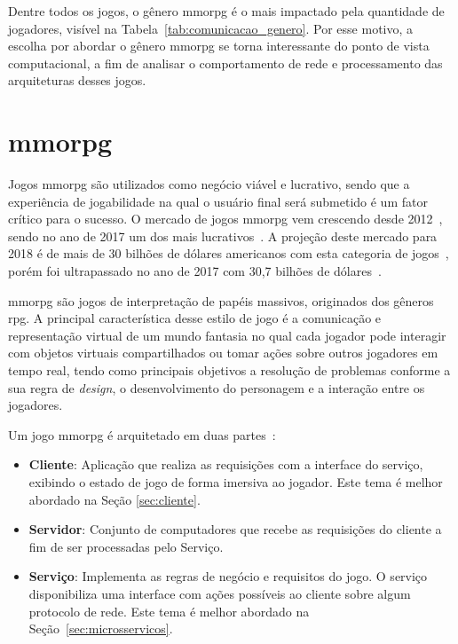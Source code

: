 Dentre todos os jogos, o gênero \ac{mmorpg} é o mais impactado pela quantidade de jogadores\cite{mmo_analytic}, visível na Tabela~\ref{tab:comunicacao_genero}.
%
Por esse motivo, a escolha por abordar o gênero \ac{mmorpg} se torna interessante do ponto de vista computacional, a fim de analisar o comportamento de rede e processamento das arquiteturas desses jogos.


\section{\ac{mmorpg}}
\label{sec:mmorpg}



Jogos \ac{mmorpg} são utilizados como negócio viável e lucrativo, sendo que a experiência de jogabilidade na qual o usuário final será submetido é um fator crítico para o sucesso.
%
O mercado de jogos \ac{mmorpg} vem crescendo desde 2012~\cite{new_york_times}, sendo no ano de 2017 um dos mais lucrativos~\cite{statista_2018_mmo}.
%
A projeção deste mercado para 2018 é de mais de 30 bilhões de dólares americanos com esta categoria de jogos~\cite{statista_2018}, porém foi ultrapassado no ano de 2017 com 30,7 bilhões de dólares~\cite{statista_2018_mmo}.



\ac{mmorpg} são jogos de interpretação de papéis massivos, originados dos gêneros \ac{rpg}.
%
A principal característica desse estilo de jogo é a comunicação e representação virtual de um mundo fantasia no qual cada jogador pode interagir com objetos virtuais compartilhados ou tomar ações sobre outros jogadores em tempo real, tendo como principais objetivos a resolução de problemas conforme a sua regra de \textit{design}, o desenvolvimento do personagem e a interação entre os jogadores\cite{video_game_technologies}.



Um jogo \ac{mmorpg} é arquitetado em duas partes~\cite{mmo_analytic}:
\begin{itemize}
  \item \textbf{Cliente}: Aplicação que realiza as requisições com a interface do serviço, exibindo o estado de jogo de forma imersiva ao jogador. Este tema é melhor abordado na Seção \ref{sec:cliente}.
  \item \textbf{Servidor}: Conjunto de computadores que recebe as requisições do cliente a fim de ser processadas pelo Serviço.
  \item \textbf{Serviço}: Implementa as regras de negócio e requisitos do jogo. O serviço disponibiliza uma interface com ações possíveis ao cliente sobre algum protocolo de rede. Este tema é melhor abordado na Seção~\ref{sec:microsservicos}.
\end{itemize}


